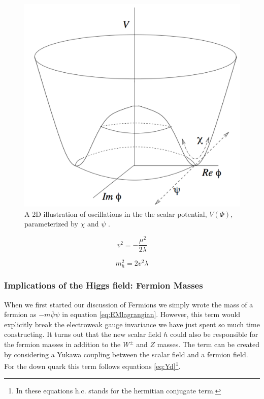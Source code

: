 \begin{figure}
\begin{center}
\includegraphics[width=0.75\linewidth]{Introduction/Oscillations_VEV.pdf}
\caption[A 2D illustration of oscillations in the the scalar potential, $V\left(\Phi\right)$, parameterized by $\chi$ and $\psi$.]{A 2D illustration of oscillations in the the scalar potential, $V\left(\Phi\right)$, parameterized by $\chi$ and $\psi$ \cite{Maggiore11.2:2005}.}
\label{fig:Oscillate}
\end{center}
\end{figure}

\begin{equation}
\label{eq:VeV}
v^{2} = -\frac{\mu^2}{2\lambda}
\end{equation}

\begin{equation}
\label{eq:Hmass}
m_{h}^{2} = 2v^{2}\lambda
\end{equation}

\subsubsection{Implications of the Higgs field: Fermion Masses}
\label{sec:FermionMasses}

When we first started our discussion of Fermions we simply wrote the mass of a fermion as $-m\bar{\psi}\psi$ in equation \eqref{eq:EMlagrangian}. However, this term would explicitly break the electroweak gauge invariance we have just spent so much time constructing. It turns out that the new scalar field $h$ could also be responsible for the fermion masses in addition to the $W^{\pm}$ and $Z$ masses. The term can be created by considering a Yukawa coupling between the scalar field and a fermion field. For the down quark this term follows equations \eqref{eq:Yd}\footnote{In these equations h.c. stands for the hermitian conjugate term.}.

